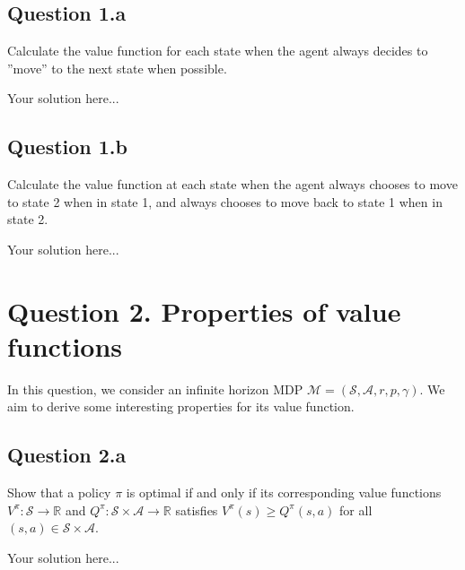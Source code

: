 \documentclass[12pt]{article}
\begin{document}
\subsection*{Question 1.a}
Calculate the value function for each state when the agent
always decides to ”move” to the next state when possible.
\begin{solution}
Your solution here...
\end{solution}

\subsection*{Question 1.b}
Calculate the value function at each state when the agent always chooses to move to state 2 when in state 1, and always chooses to move back to state 1 when in state 2.
\begin{solution}
Your solution here...
\end{solution}

\section*{Question 2. Properties of value functions}
In this question, we consider an infinite horizon MDP $\mathcal{M} = (\mathcal{S}, \mathcal{A}, r, p, \gamma)$. We aim to derive some interesting properties for its value function.
\subsection*{Question 2.a} 
Show that a policy $\pi$ is optimal if and only if its corresponding value functions  $V^\pi: \mathcal{S} \rightarrow \mathbb{R}$ and $Q^\pi: \mathcal{S} \times \mathcal{A} \rightarrow \mathbb{R}$ satisfies $V^{\pi}(s)\geq Q^{\pi}(s,a)$  for all $(s,a) \in \mathcal{S} \times \mathcal{A}$.
\begin{solution}
Your solution here...
\end{solution}

\end{document}
